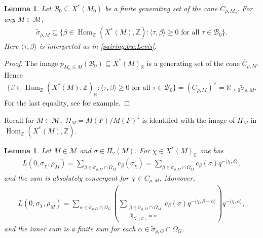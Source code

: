 \documentclass[10pt]{amsart}
\newtheorem{lemma}[theorem]{Lemma}
\theoremstyle{definition}
\numberwithin{equation}{section}
\DeclareMathOperator{\Hom}{\mathrm{Hom}}
\numberwithin{equation}{subsection}
\newcommand{\ZZ}{\mathbb{Z}}
\newcommand{\RR}{\mathbb{R}}
\newcommand{\CC}{\mathbb{C}}
\begin{document}
\begin{lemma}\label{Lcone:dualdual} Let $\mathcal{B}_0\subseteq X^*(M_0)$ be a finite generating set of the cone $\overline{C}_{\rho,M_0}$. For any $M\in \mathcal{M}$,
\begin{align*}
    \widetilde{\sigma}_{\rho,M} \subseteq \{\beta\in\Hom_\ZZ(X^*(M),\ZZ): \langle\tau,\beta\rangle\geq 0\text{ for all }\tau\in\mathcal{B}_0\}.
\end{align*}
Here $\langle\tau,\beta\rangle$ is interpreted as in \eqref{pairing:bw:Levis}.
\end{lemma}
\begin{proof} The image $p_{M_0\leq M}(\mathcal{B}_0)\subseteq X^*(M)_\RR$ is a generating set of the cone $\overline{C}_{\rho,M}$. Hence
\begin{align*}
    \{\beta\in\Hom_\ZZ(X^*(M),\ZZ)_\RR: \langle\tau,\beta\rangle\geq 0\text{ for all }\tau\in\mathcal{B}_0\} = (\overline{C}_{\rho,M})^\vee = \mathbb{R}_{\geq 0}\widetilde{\sigma}_{\rho,M}.
\end{align*}
For the last equality, see \cite[p.9 (1)]{Fulton:toric} for example. 
\end{proof}

Recall for $M\in \mathcal{M},$ $\Omega_M=M(F)/M(F)^1$ is identified with the image of $H_M$ in $\Hom_\ZZ(X^\ast(M),\ZZ).$

\begin{lemma}\label{Lfunction:expand:cone} Let $M\in \mathcal{M}$ and $\sigma\in \Pi_2(M)$. For $\chi\in X^*(M)_\CC$ one has
\begin{align*}
    L(0,\sigma_\chi,\rho_M) = \sum_{\beta\in\widetilde{\sigma}_{\rho,M}\cap \Omega_M}c_\beta(\sigma_\chi) = \sum_{\beta\in\widetilde{\sigma}_{\rho,M}\cap \Omega_M}c_\beta(\sigma) q^{-\langle\chi,\beta\rangle},
\end{align*}
and the sum is absolutely convergent for $\chi\in C_{\rho,M}$. Moreover, 
\begin{align*}
    L(0,\sigma_\chi,\rho_M) = \sum_{\alpha\in\widetilde{\sigma}_{\rho,G}\cap \Omega_G}\left(\sum_{\substack{\beta\in\widetilde{\sigma}_{\rho,M}\cap \Omega_M\\\beta\vert_{X^*(G)} = \alpha}}c_{\beta}(\sigma)q^{-\langle \chi,\beta-\alpha\rangle}\right)q^{-\langle\chi,\alpha\rangle},
\end{align*}
and the inner sum is a finite sum for each $\alpha\in\widetilde{\sigma}_{\rho,G}\cap \Omega_G$.
\end{lemma}
\end{document}
